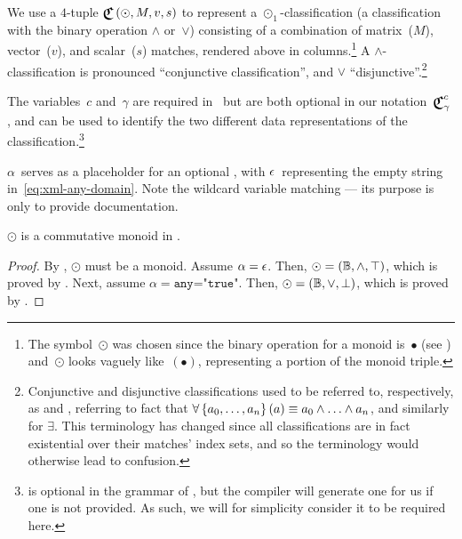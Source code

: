 We use a $4$-tuple $\Classify\left(\odot,M,v,s\right)$ to represent a
  $\odot_1$-classification
    (a classification with the binary operation $\land$ or~$\lor$)
  consisting of a combination of matrix~($M$), vector~($v$), and
    scalar~($s$) matches,
      rendered above in columns.\footnote{%
        The symbol~$\odot$ was chosen since the binary operation for a monoid
          is~$\bullet$
            (see )
          and~$\odot$ looks vaguely like~$(\bullet)$,
            representing a portion of the monoid triple.}
A $\land$-classification is pronounced ``conjunctive classification'',
  and $\lor$ ``disjunctive''.\footnote{%
    Conjunctive and disjunctive classifications used to be referred to,
      respectively,
      as  and ,
        referring to fact that
          $\forall\left\{a_0,\ldots,a_n\right\}(a) \equiv a_0\land\ldots\land a_n$,
            and similarly for $\exists$.
    This terminology has changed since all classifications are in fact
      existential over their matches' index sets,
        and so the terminology would otherwise lead to confusion.}

The variables~$c$ and~$\gamma$ are required in~\tame{} but are both optional
  in our notation~$\Classify^c_\gamma$,
    and can be used to identify the two different data representations of
    the classification.\footnote{%
       is optional in the grammar of \tame{},
        but the compiler will generate one for us if one is not provided.
      As such,
        we will for simplicity consider it to be required here.}

$\alpha$~serves as a placeholder for an optional ,
  with $\epsilon$~representing the empty string in~\eqref{eq:xml-any-domain}.
Note the wildcard variable matching ---%
  its purpose is only to provide documentation.

\begin{corollary}
  $\odot$ is a commutative monoid in .
\end{corollary}
\begin{proof}
  By ,
    $\odot$ must be a monoid.
  Assume $\alpha=\epsilon$.
  Then,
    $\odot = \left({\mathbb{B}},{\land},{\top}\right)$,
      which is proved by .
  Next, assume $\alpha=\texttt{any="true"}$.
  Then,
    $\odot = \left({\mathbb{B}},{\lor},{\bot}\right)$,
      which is proved by .
\end{proof}

